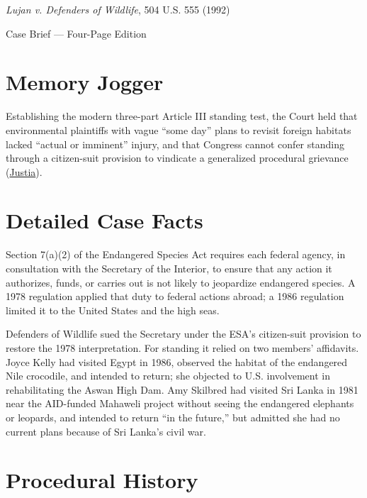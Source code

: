 \documentclass[12pt]{article}
\begin{document}
\begin{center}
{\LARGE \textit{Lujan v. Defenders of Wildlife}, 504 U.S. 555 (1992)\par}
\vspace{0.8em}
{\large Case Brief --- Four-Page Edition\par}
\end{center}
\vspace{1em}

\section{Memory Jogger}

Establishing the modern three-part Article III standing test, the Court held that environmental plaintiffs with vague ``some day'' plans to revisit foreign habitats lacked ``actual or imminent'' injury, and that Congress cannot confer standing through a citizen-suit provision to vindicate a generalized procedural grievance (\href{https://supreme.justia.com/cases/federal/us/504/555/}{Justia}).

\section{Detailed Case Facts}

Section 7(a)(2) of the Endangered Species Act requires each federal agency, in consultation with the Secretary of the Interior, to ensure that any action it authorizes, funds, or carries out is not likely to jeopardize endangered species. A 1978 regulation applied that duty to federal actions abroad; a 1986 regulation limited it to the United States and the high seas.

Defenders of Wildlife sued the Secretary under the ESA's citizen-suit provision to restore the 1978 interpretation. For standing it relied on two members' affidavits. Joyce Kelly had visited Egypt in 1986, observed the habitat of the endangered Nile crocodile, and intended to return; she objected to U.S. involvement in rehabilitating the Aswan High Dam. Amy Skilbred had visited Sri Lanka in 1981 near the AID-funded Mahaweli project without seeing the endangered elephants or leopards, and intended to return ``in the future,'' but admitted she had no current plans because of Sri Lanka's civil war.

\section{Procedural History}
\end{document}
